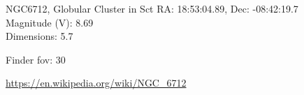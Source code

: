 \begin{block}{NGC6712, Globular Cluster in Sct}
    RA: 18:53:04.89, Dec: -08:42:19.7 \\ 
    Magnitude (V): 8.69 \\ 
    Dimensions: 5.7 

    Finder fov: 30 

    \url{https://en.wikipedia.org/wiki/NGC_6712} 
\end{block}